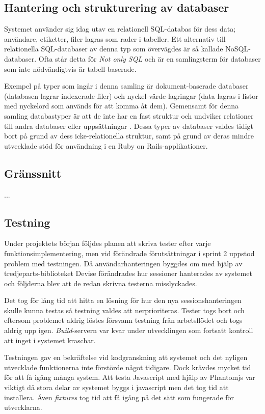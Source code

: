 \subsection{Hantering och strukturering av databaser}

Systemet använder sig idag utav en relationell SQL-databas för dess data; användare, etiketter, filer lagras som rader i tabeller. Ett alternativ till relationella SQL-databaser av denna typ som övervägdes är så kallade NoSQL-databaser. Ofta står detta för \emph{Not only SQL} \cite{nosql} och är en samlingsterm för databaser som inte nödvändigtvis är tabell-baserade.

Exempel på typer som ingår i denna samling är dokument-baserade databaser (databasen lagrar indexerade filer) och nyckel-värde-lagringar (data lagras i listor med nyckelord som används för att komma åt dem). Gemensamt för denna samling databastyper är att de inte har en fast struktur och undviker relationer till andra databaser eller uppsättningar \cite{largedata}. Dessa typer av databaser valdes tidigt bort på grund av dess icke-relationella struktur, samt på grund av deras mindre utvecklade stöd för användning i en Ruby on Rails-applikationer.

\subsection{Gränssnitt}

...

\subsection{Testning}

Under projektets början följdes planen att skriva tester efter varje funktionsimplementering, men vid förändrade förutsättningar i sprint 2 uppstod problem med testningen. Då användarhanteringen byggdes om med hjälp av tredjeparts-biblioteket Devise förändrades hur sessioner hanterades av systemet och följderna blev att de redan skrivna testerna misslyckades.

Det tog för lång tid att hitta en lösning för hur den nya sessionshanteringen skulle kunna testas så testning valdes att nerprioriteras. Tester togs bort och eftersom problemet aldrig löstes försvann testning från arbetsflödet och togs aldrig upp igen. \emph{Build}-servern var kvar under utvecklingen som fortsatt kontroll att inget i systemet kraschar.

Testningen gav en bekräftelse vid kodgranskning att systemet och det nyligen utvecklade funktionerna inte förstörde något tidigare. Dock krävdes mycket tid för att få igång många system. Att testa Javascript med hjälp av Phantomjs var viktigt då stora delar av systemet byggs i javascript men det tog tid att installera. Även \emph{fixtures} tog tid att få igång på det sätt som fungerade för utvecklarna.

